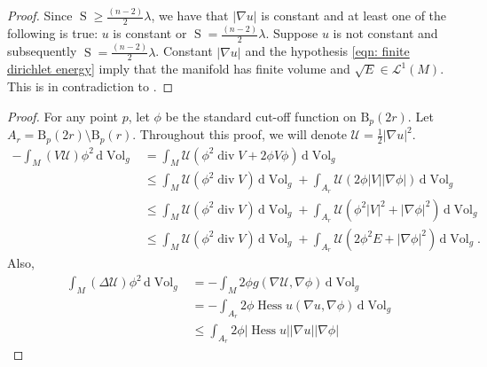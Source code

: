 \documentclass{amsart}
\newcommand{\abs}[1]{\left| #1 \right|}
\newcommand{\derivative}{\mathrm{d}}
\newcommand{\brackets}[1]{\left( #1 \right)}
\DeclareMathOperator*{\scalar}{S}
\DeclareMathOperator*{\divergence}{div}
\DeclareMathOperator*{\hessian}{Hess}
\DeclareMathOperator*{\Vol}{Vol}
\theoremstyle{plain}
\theoremstyle{plain}
\theoremstyle{plain}
\theoremstyle{plain}
\theoremstyle{remark}
\begin{document}
\begin{proof}
    
    Since $\scalar \geq \frac{(n-2)}{2} \lambda $, we have that $\abs{\nabla u}$ is constant and at least one of the following is true: $u$ is constant or $\scalar = \frac{(n-2)}{2} \lambda$. 
    Suppose $u$ is not constant and subsequently $\scalar = \frac{(n-2)}{2} \lambda$.
    Constant $\abs{\nabla u}$ and the hypothesis \cref{eqn: finite dirichlet energy} imply that the manifold has finite volume and $\sqrt{E}\in \mathcal{L}^1 (M)$. 
    This is in contradiction to .
\end{proof}


\NoVHarmonic*
\begin{proof}
    For any point $p$, let $\phi$ be the standard cut-off function on $\mathrm{B}_p(2r)$.
    Let $A_r = \mathrm{B}_p(2r) \setminus \mathrm{B}_p(r) $.
    Throughout this proof, we will denote $\mathcal{U} = \frac{1}{2} \abs{\nabla u}^2$.
    \begin{align*}
        - \int_M \brackets{V \mathcal{U} } \phi^2 \, \derivative {\Vol}_g
            &= \int_M \mathcal{U} \left( \phi^2 \divergence V 
                + 2\phi V\phi \right) \, \derivative {\Vol}_g \\
            &\leq \int_M \mathcal{U} (\phi^2 \divergence V) \, \derivative {\Vol}_g
                + \int_{A_r} \mathcal{U} (2\phi \abs{V}\abs{\nabla \phi}) 
                    \, \derivative {\Vol}_g \\
            &\leq \int_M \mathcal{U} (\phi^2 \divergence V) \, \derivative {\Vol}_g
                + \int_{A_r} \mathcal{U} 
                    \left( \phi^2 \abs{V}^2  + \abs{\nabla \phi}^2  \right) 
                    \, \derivative {\Vol}_g \\
            &\leq \int_M \mathcal{U} (\phi^2 \divergence V) \, \derivative {\Vol}_g
                + \int_{A_r} \mathcal{U} 
                    \left( 2\phi^2 E + \abs{\nabla \phi}^2  \right) 
                    \, \derivative  {\Vol}_g .
    \end{align*}
    Also,
    \begin{align*}
        \int_M \brackets{ \Delta\mathcal{U} } \phi^2 \, \derivative {\Vol}_g 
            &= - \int_M  2\phi g \brackets{ \nabla\mathcal{U} , \nabla \phi  }
                \, \derivative {\Vol}_g \\
            &= - \int_{A_r} 2\phi \hessian u ( \nabla u, \nabla\phi  )
                \, \derivative {\Vol}_g \\
            &\leq \int_{A_r} 2\phi \abs{\hessian u} \abs{\nabla u} \abs{\nabla \phi}

\end{align*}
\end{proof}
\end{document}
